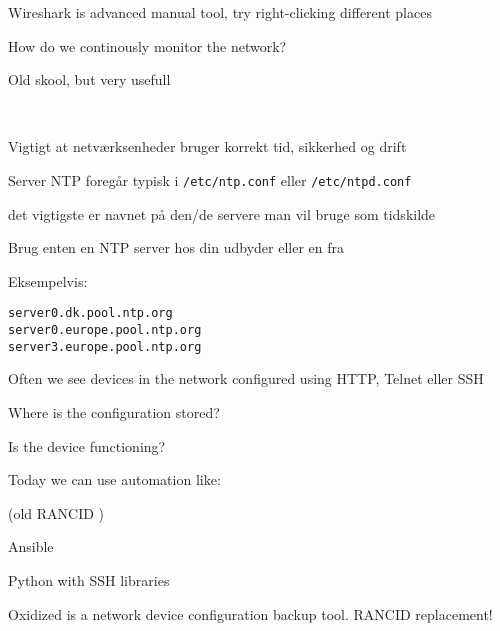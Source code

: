 \documentclass[Screen16to9,17pt]{foils}
\begin{document}
\begin{list2}
\item Wireshark is advanced manual tool, try right-clicking different places
\item How do we continously monitor the network?
\end{list2}





Old skool, but very usefull 







{~}

\begin{list1}
\item Vigtigt at netværksenheder bruger korrekt tid, sikkerhed og drift
\item Server NTP foregår typisk i \verb+/etc/ntp.conf+ eller \verb+/etc/ntpd.conf+
\item det vigtigste er navnet på den/de servere man vil bruge som tidskilde
\item Brug enten en NTP server hos din udbyder eller en fra 
\item Eksempelvis:
\end{list1}

\begin{alltt}
server 0.dk.pool.ntp.org
server 0.europe.pool.ntp.org
server 3.europe.pool.ntp.org

\end{alltt}






\begin{list1}
\item Often we see devices in the network configured using HTTP, Telnet eller SSH
\begin{list2}
\item Where is the configuration stored?
\item Is the device functioning?
\end{list2}
\item Today we can use automation like:
\begin{list2}
\item (old RANCID )
\item Ansible 
\item Python with SSH libraries
\item Oxidized is a network device configuration backup tool. RANCID replacement!
\end{list2}
\end{list1}
\end{document}
